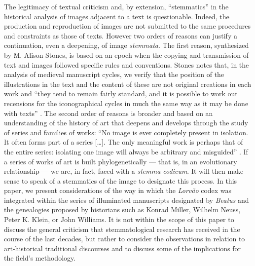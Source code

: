 \begin{paper}
The legitimacy of textual criticism and, by extension, ``stemmatics'' in
the historical analysis of images adjacent to a text is questionable.
Indeed, the production and reproduction of images are not submitted to
the same procedures and constraints as those of texts. However two
orders of reasons can justify a continuation, even a deepening, of image
\emph{stemmata}. The first reason, synthesized by M. Alison Stones, is
based on an epoch when the copying and transmission of text and images
followed specific rules and conventions. Stones notes that, in the
analysis of medieval manuscript cycles, we verify that the position of
the illustrations in the text and the content of these are not original
creations in each work and ``they tend to remain fairly standard, and it
is possible to work out recensions for the iconographical cycles in much
the same way as it may be done with texts'' \citep[96]{stones_secular_1976}. The
second order of reasons is broader and based on an understanding of the
history of art that deepens and develops through the study of series and
families of works: ``No image is ever completely present in isolation.
It often forms part of a series [\ldots]. The only meaningful work is
perhaps that of the entire series: isolating one image will always be
arbitrary and misguided'' \citep[31]{schmitt_images_2003}. If a series of works of
art is built phylogenetically ––  that is, in an evolutionary
relationship ––  we are, in fact, faced with a \emph{stemma codicum}. It
will then make sense to speak of a stemmatics of the image to designate
this process. In this paper, we present considerations of the way in
which the \emph{Lorvão} codex was integrated within the series of
illuminated manuscripts designated by \emph{Beatus} and the genealogies
proposed by historians such as Konrad Miller, Wilhelm Neuss, Peter K.
Klein, or John Williams. It is not within the scope of this paper to
discuss the general criticism that stemmatological research has received
in the course of the last decades, but rather to consider the
observations in relation to art-historical traditional discourses and to
discuss some of the implications for the field's methodology.


\end{paper}
